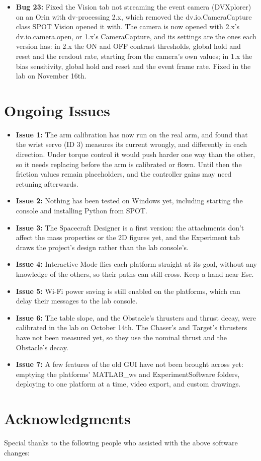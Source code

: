\documentclass[11pt]{article}
\begin{document}
\begin{itemize}[label={\textcolor{primaryColor}{\textbullet}}]
    \item \textbf{Bug 23:} Fixed the Vision tab not streaming the event camera (DVXplorer) on an Orin with dv-processing 2.x, which removed the dv.io.CameraCapture class SPOT Vision opened it with. The camera is now opened with 2.x's dv.io.camera.open, or 1.x's CameraCapture, and its settings are the ones each version has: in 2.x the ON and OFF contrast thresholds, global hold and reset and the readout rate, starting from the camera's own values; in 1.x the bias sensitivity, global hold and reset and the event frame rate. Fixed in the lab on November 16th.
\end{itemize}

\section*{\textcolor{primaryColor}{Ongoing Issues}}
\begin{itemize}[label={\textcolor{primaryColor}{\textbullet}}]
    \item \textbf{Issue 1:} The arm calibration has now run on the real arm, and found that the wrist servo (ID 3) measures its current wrongly, and differently in each direction. Under torque control it would push harder one way than the other, so it needs replacing before the arm is calibrated or flown. Until then the friction values remain placeholders, and the controller gains may need retuning afterwards.
    \item \textbf{Issue 2:} Nothing has been tested on Windows yet, including starting the console and installing Python from SPOT.
    \item \textbf{Issue 3:} The Spacecraft Designer is a first version: the attachments don't affect the mass properties or the 2D figures yet, and the Experiment tab draws the project's design rather than the lab console's.
    \item \textbf{Issue 4:} Interactive Mode flies each platform straight at its goal, without any knowledge of the others, so their paths can still cross. Keep a hand near Esc.
    \item \textbf{Issue 5:} Wi-Fi power saving is still enabled on the platforms, which can delay their messages to the lab console.
    \item \textbf{Issue 6:} The table slope, and the Obstacle's thrusters and thrust decay, were calibrated in the lab on October 14th. The Chaser's and Target's thrusters have not been measured yet, so they use the nominal thrust and the Obstacle's decay.
    \item \textbf{Issue 7:} A few features of the old GUI have not been brought across yet: emptying the platforms' MATLAB\_ws and ExperimentSoftware folders, deploying to one platform at a time, video export, and custom drawings.
\end{itemize}

\section*{\textcolor{primaryColor}{Acknowledgments}}
Special thanks to the following people who assisted with the above software changes:
\end{document}
